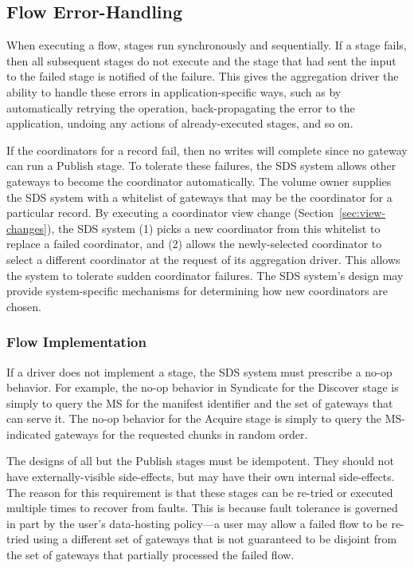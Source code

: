 \subsection{Flow Error-Handling}
\label{sec:flow-error-handling}

When executing a flow, stages run synchronously and sequentially.
If a stage fails, then all subsequent stages do not execute
and the stage that had sent the input to the
failed stage is notified of the failure.  This gives the aggregation driver
the ability to handle these errors in application-specific ways, such as by
automatically retrying the operation, back-propagating the error to the application, 
undoing any actions of already-executed stages, and so on.

If the coordinators for a record fail, then no writes will complete since no
gateway can run a Publish stage.  To
tolerate these failures, the SDS system allows other gateways to
become the coordinator automatically.  The volume owner supplies the SDS system with a
whitelist of gateways that may be the coordinator for a particular record.
By executing a coordinator view change (Section~\ref{sec:view-changes}), the SDS
system (1) picks a new coordinator from this
whitelist to replace a failed coordinator, and (2) allows the newly-selected coordinator
to select a different coordinator at the request of its aggregation driver.
This allows the system to tolerate sudden coordinator failures.  The SDS system's
design may provide system-specific mechanisms for determining how new
coordinators are chosen.

\subsubsection{Flow Implementation}

If a driver does not implement a stage, the SDS system must prescribe a
no-op behavior.  For example, the no-op behavior in Syndicate for the
Discover stage is simply to query the MS for the manifest identifier and the 
set of gateways that can serve it.  The no-op behavior for the Acquire
stage is simply to query the MS-indicated gateways for the requested chunks
in random order.

The designs of all but the Publish stages must be
idempotent.  They should not have externally-visible side-effects, but may have
their own internal side-effects.  The reason
for this requirement is that these stages can be re-tried or executed
multiple times to recover from faults.  This is because fault tolerance is
governed in part by the user's data-hosting policy---a user may
allow a failed flow to be re-tried using a different set of gateways that is not
guaranteed to be disjoint from the set of gateways that partially processed
the failed flow.

